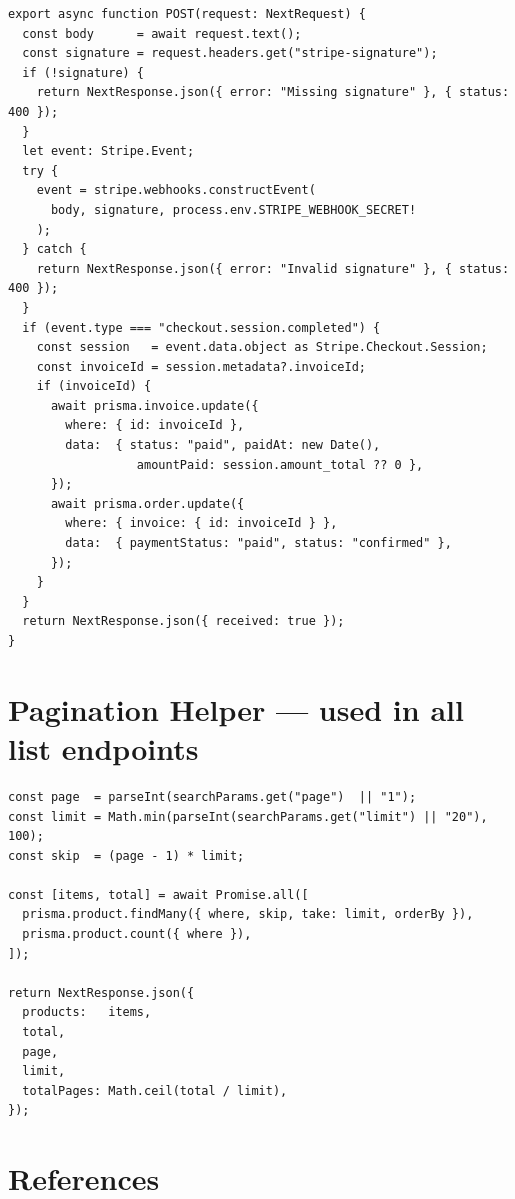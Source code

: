 \documentclass[12pt,a4paper]{report}
\begin{document}
\begin{lstlisting}[caption={Stripe webhook signature verification and invoice status update}]
export async function POST(request: NextRequest) {
  const body      = await request.text();
  const signature = request.headers.get("stripe-signature");
  if (!signature) {
    return NextResponse.json({ error: "Missing signature" }, { status: 400 });
  }
  let event: Stripe.Event;
  try {
    event = stripe.webhooks.constructEvent(
      body, signature, process.env.STRIPE_WEBHOOK_SECRET!
    );
  } catch {
    return NextResponse.json({ error: "Invalid signature" }, { status: 400 });
  }
  if (event.type === "checkout.session.completed") {
    const session   = event.data.object as Stripe.Checkout.Session;
    const invoiceId = session.metadata?.invoiceId;
    if (invoiceId) {
      await prisma.invoice.update({
        where: { id: invoiceId },
        data:  { status: "paid", paidAt: new Date(),
                  amountPaid: session.amount_total ?? 0 },
      });
      await prisma.order.update({
        where: { invoice: { id: invoiceId } },
        data:  { paymentStatus: "paid", status: "confirmed" },
      });
    }
  }
  return NextResponse.json({ received: true });
}
\end{lstlisting}

\section{Pagination Helper --- used in all list endpoints}

\begin{lstlisting}[caption={Offset-based pagination with parallel count query}]
const page  = parseInt(searchParams.get("page")  || "1");
const limit = Math.min(parseInt(searchParams.get("limit") || "20"), 100);
const skip  = (page - 1) * limit;

const [items, total] = await Promise.all([
  prisma.product.findMany({ where, skip, take: limit, orderBy }),
  prisma.product.count({ where }),
]);

return NextResponse.json({
  products:   items,
  total,
  page,
  limit,
  totalPages: Math.ceil(total / limit),
});
\end{lstlisting}

\section*{References}
\end{document}
